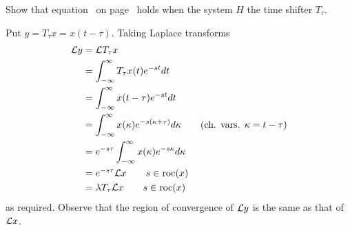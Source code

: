 \begin{excersizelist}
\item \label{exer:laplacetranstimeshift} Show that equation~ on page~ holds when the system $H$ the time shifter $T_\tau$. 
\begin{solution}
Put $y = T_\tau x = x(t- \tau)$.  Taking Laplace transforms
\begin{align*}
\mathcal L y &= \mathcal L T_\tau x \\
&= \int_{-\infty}^{\infty} T_\tau x(t) e^{-st} dt \\
&= \int_{-\infty}^{\infty} x(t - \tau) e^{-st} dt \\
&= \int_{-\infty}^{\infty} x(\kappa) e^{-s(\kappa + \tau)} d\kappa \qquad \text{(ch. vars. $\kappa = t - \tau$)} \\
&= e^{-s\tau}\int_{-\infty}^{\infty} x(\kappa) e^{-s\kappa} d\kappa \\
&= e^{-s\tau} \mathcal L x \qquad s \in \operatorname{roc}(x) \\
&= \lambda T_\tau  \mathcal L x \qquad s \in \operatorname{roc}(x)
\end{align*}
as required.  Observe that the region of convergence of $\mathcal L y$ is the same as that of $\mathcal L x$.
\end{solution}


\end{excersizelist}
